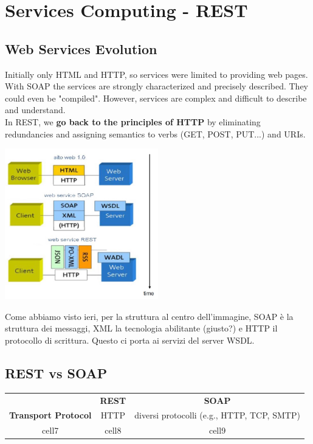 \chapter{Services Computing - REST}
\section{Web Services Evolution}
Initially only HTML and HTTP, so services were limited to providing web pages.
\\With SOAP the services are strongly characterized and precisely described. They could even be "compiled". However, services are complex and difficult to describe and understand.
\\In REST, we \textbf{go back to the principles of HTTP} by eliminating redundancies and assigning semantics to verbs (GET, POST, PUT...) and URIs.
\begin{center}
    \includegraphics[width=0.5\textwidth]{img/REST1.jpg}
\end{center}
Come abbiamo visto ieri, per la struttura al centro dell'immagine, SOAP è la struttura dei messaggi, XML la tecnologia abilitante (giusto?) e HTTP il protocollo di scrittura. Questo ci porta ai servizi del server WSDL.

\section{REST vs SOAP}
\begin{center}
    \begin{tabular}{ |c|c|c| } 
        \hline
         & \textbf{REST} & \textbf{SOAP} \\ 
        \textbf{Transport Protocol} & HTTP & diversi protocolli (e.g., HTTP, TCP, SMTP) \\ 
        cell7 & cell8 & cell9 \\ 
        \hline
    \end{tabular}
\end{center}





